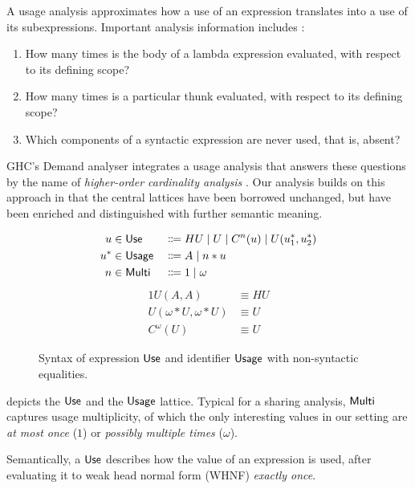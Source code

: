 A usage analysis approximates how a use of an expression translates into a use of its subexpressions. Important analysis information includes \parencite{card}:

\begin{enumerate}
\item How many times is the body of a lambda expression evaluated, with respect to its defining scope?
\item How many times is a particular thunk evaluated, with respect to its defining scope?
\item Which components of a syntactic expression are never used, that is, absent?
\end{enumerate}

GHC's Demand analyser integrates a usage analysis that answers these questions by the name of \emph{higher-order cardinality analysis} \parencite{card}. 
Our analysis builds on this approach in that the central lattices have been borrowed unchanged, but have been enriched and distinguished with further semantic meaning.

\begin{figure}
\begin{alignat*}{2}
u   &\in \text{\textsf{Use}}   &{} \Coloneqq {}& HU \mid U \mid C^n(u) \mid U(u^*_1, u^*_2) \\
u^* &\in \text{\textsf{Usage}} &{} \Coloneqq {}& A \mid n*u \\
n   &\in \text{\textsf{Multi}} &{} \Coloneqq {}& 1 \mid \omega
\end{alignat*}
\begin{alignat*}{1}
U(A,A)               &\equiv HU \\
U(\omega*U,\omega*U) &\equiv U \\
C^\omega(U)          &\equiv U
\end{alignat*}
\caption{Syntax of expression $\text{\textsf{Use}}$ and identifier $\text{\textsf{Usage}}$ with non-syntactic equalities.}
\label{fig:usg}
\end{figure}

 depicts the $\text{\textsf{Use}}$ and the $\text{\textsf{Usage}}$ lattice. 
Typical for a sharing analysis, $\text{\textsf{Multi}}$ captures usage multiplicity, of which the only interesting values in our setting are \emph{at most once} ($1$) or \emph{possibly multiple times} ($\omega$).

Semantically, a $\text{\textsf{Use}}$ describes how the value of an expression is used, after evaluating it to weak head normal form (WHNF) \emph{exactly once}.

